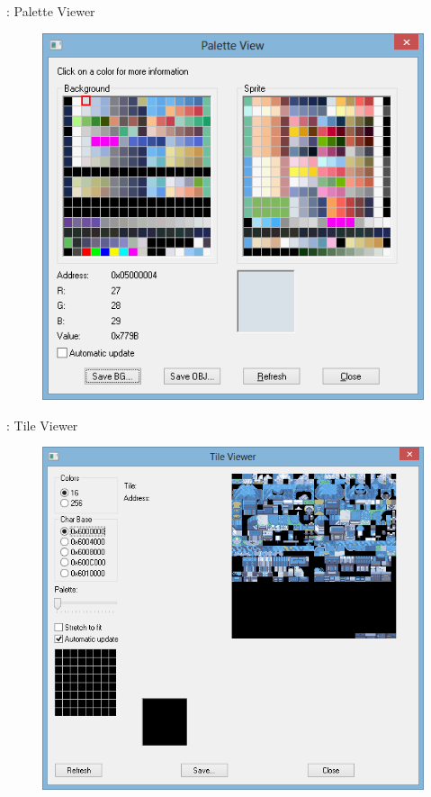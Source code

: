 \documentclass{beamer}
\begin{document}
\begin{darkframes}
\begin{frame}{\subsecname: Palette Viewer}
    \begin{figure}
        \centering
        \includegraphics[width=1\textwidth,height=0.5\textheight,keepaspectratio]{paletteview}
    \end{figure}
\end{frame}

\begin{frame}{\subsecname: Tile Viewer}
    \begin{figure}
        \centering
        \includegraphics[width=1\textwidth,height=0.5\textheight,keepaspectratio]{tileview}
    \end{figure}
\end{frame}



\end{darkframes}
\end{document}
